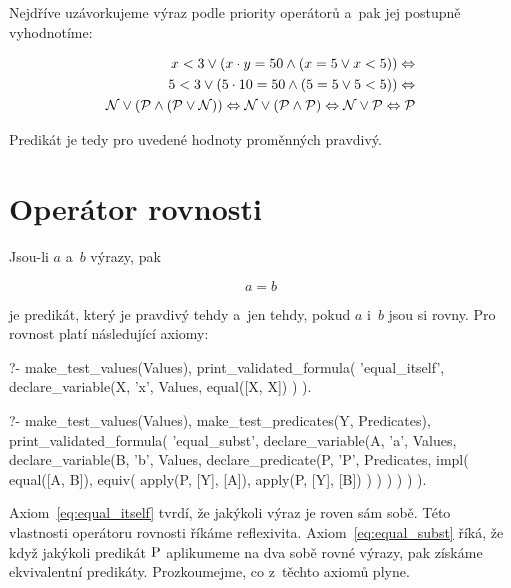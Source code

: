 Nejdříve uzávorkujeme výraz podle priority operátorů a~pak jej postupně vyhodnotíme:

\begin{equation}
\begin{split}
x < 3 \lor (x \cdot y = 50 \land (x = 5 \lor x < 5)) \Leftrightarrow \\
5 < 3 \lor (5 \cdot 10 = 50 \land (5 = 5 \lor 5 < 5)) \Leftrightarrow \\
\mathcal{N} \lor (\mathcal{P} \land (\mathcal{P} \lor \mathcal{N})) \Leftrightarrow \mathcal{N} \lor (\mathcal{P} \land \mathcal{P}) \Leftrightarrow \mathcal{N} \lor \mathcal{P} \Leftrightarrow \mathcal{P} 
\end{split}
\end{equation}

Predikát je tedy pro uvedené hodnoty proměnných pravdivý.


\section{Operátor rovnosti}
\label{sec:equality_operator}

Jsou-li \(a\) a~\(b\) výrazy, pak

\begin{equation}
a = b
\end{equation}

je predikát, který je pravdivý tehdy a~jen tehdy, pokud \(a\) i~\(b\) jsou si rovny. Pro rovnost platí následující axiomy:

\begin{fact}
\begin{prolog}
?- 	make_test_values(Values),
	print_validated_formula(
		'equal_itself',
		declare_variable(X, 'x', Values,
			equal([X, X])
		)
	).
\end{prolog}
\begin{prolog}
?- 	make_test_values(Values),
	make_test_predicates(Y, Predicates),
	print_validated_formula(
		'equal_subst',
		declare_variable(A, 'a', Values,
			declare_variable(B, 'b', Values,
				declare_predicate(P, 'P', Predicates,
					impl(
						equal([A, B]),
						equiv(
							apply(P, [Y], [A]),
							apply(P, [Y], [B])
						)
					)
				)
			)
		)
	).
\end{prolog}
\end{fact}

Axiom~\eqref{eq:equal_itself} tvrdí, že jakýkoli výraz je roven sám sobě. Této vlastnosti operátoru rovnosti říkáme reflexivita. Axiom~\eqref{eq:equal_subst} říká, že když jakýkoli predikát \(\mathrm{P}\) aplikumeme na dva sobě rovné výrazy, pak získáme ekvivalentní predikáty. Prozkoumejme, co z~těchto axiomů plyne.

